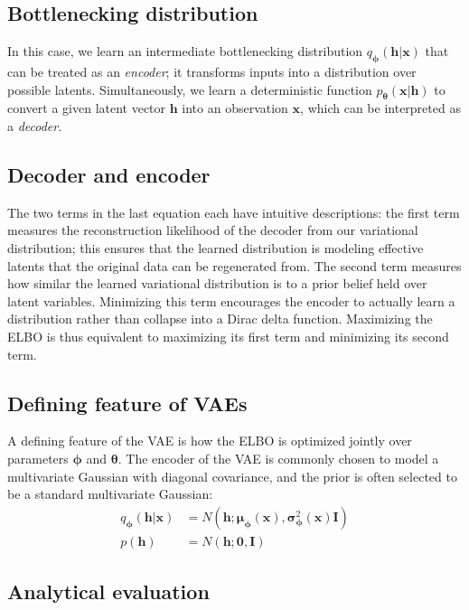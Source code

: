 \documentclass[%
oneside,                 %
final,                   %
10pt]{article}
\begin{document}
\subsection{Bottlenecking distribution}

In this case, we learn an intermediate bottlenecking distribution
$q_{\bm{\phi}}(\bm{h}|\bm{x})$ that can be treated as
an \textit{encoder}; it transforms inputs into a distribution over
possible latents.  Simultaneously, we learn a deterministic function
$p_{\bm{\theta}}(\bm{x}|\bm{h})$ to convert a given latent vector
$\bm{h}$ into an observation $\bm{x}$, which can be interpreted as
a \textit{decoder}.

\subsection{Decoder and encoder}
The two terms in the last equation each have intuitive descriptions: the first
term measures the reconstruction likelihood of the decoder from our
variational distribution; this ensures that the learned distribution
is modeling effective latents that the original data can be
regenerated from.  The second term measures how similar the learned
variational distribution is to a prior belief held over latent
variables.  Minimizing this term encourages the encoder to actually
learn a distribution rather than collapse into a Dirac delta function.
Maximizing the ELBO is thus equivalent to maximizing its first term
and minimizing its second term.

\subsection{Defining feature of VAEs}

A defining feature of the VAE is how the ELBO is optimized jointly over parameters $\bm{\phi}$ and $\bm{\theta}$.  The encoder of the VAE is commonly chosen to model a multivariate Gaussian with diagonal covariance, and the prior is often selected to be a standard multivariate Gaussian: 
\begin{align*}
    q_{\bm{\phi}}(\bm{h}|\bm{x}) &= N(\bm{h}; \bm{\mu}_{\bm{\phi}}(\bm{x}), \bm{\sigma}_{\bm{\phi}}^2(\bm{x})\textbf{I})\\
    p(\bm{h}) &= N(\bm{h}; \bm{0}, \textbf{I})
\end{align*}

\subsection{Analytical evaluation}
\end{document}
